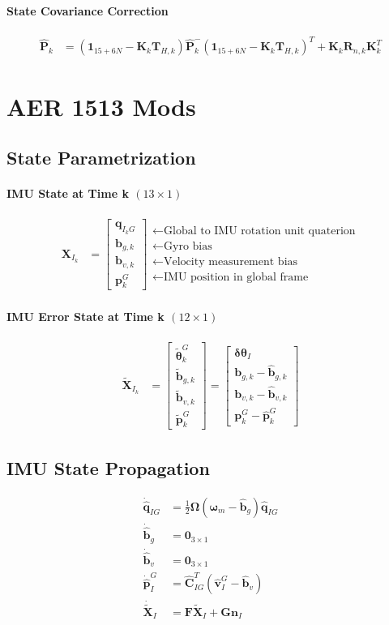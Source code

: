 \documentclass[10pt,letterpaper,fleqn,oneside]{article}
\newcommand{\nl}{\\[0.5em]}
\def\Vec#1{\mathbf{#1}} %
\newcommand{\bbm}{\begin{bmatrix}}
\newcommand{\ebm}{\end{bmatrix}}
\begin{document}
\paragraph{State Covariance Correction}
\begin{align}
\hat{\Vec{P}}_k &= \left(\Vec{1}_{15+6N} - \Vec{K}_k\Vec{T}_{H,k} \right)\hat{\Vec{P}}^-_k\left(\Vec{1}_{15+6N} - \Vec{K}_k\Vec{T}_{H,k} \right)^T + \Vec{K}_k\Vec{R}_{n,k}\Vec{K}_k^T
\end{align}

\section{AER 1513 Mods}

\subsection{State Parametrization}
\paragraph{IMU State at Time k $(13\times1)$}
\begin{align}
\Vec{X}_{I_k} &= \bbm \Vec{q}_{I_k G} \nl
								\Vec{b}_{g,k} \nl
								\Vec{b}_{v,k} \nl
								\Vec{p}^G_k 
						 \ebm 
						 \begin{array}{l}
						 \leftarrow \text{Global to IMU rotation unit quaterion} \nl
						 \leftarrow \text{Gyro bias} \nl
						 \leftarrow \text{Velocity measurement bias} \nl
						 \leftarrow \text{IMU position in global frame} 
						 \end{array}						 
\end{align}

\paragraph{IMU Error State at Time k $(12\times1)$}
\begin{align}
\widetilde{\Vec{X}}_{I_k} &= 	\bbm \widetilde{\boldsymbol{\theta}}^G_k \nl
										\widetilde{\Vec{b}}_{g,k} \nl
										\widetilde{\Vec{b}}_{v,k} \nl
										\widetilde{\Vec{p}}^G_k
								\ebm
								=
								\bbm
										\boldsymbol{\delta\theta}_I \nl
										\Vec{b}_{g,k} - \hat{\Vec{b}}_{g,k} \nl
										\Vec{b}_{v,k} - \hat{\Vec{b}}_{v,k} \nl
										\Vec{p}^G_k - \hat{\Vec{p}}^G_k 
								\ebm
\end{align}

\subsection{IMU State Propagation}
\begin{align}
\dot{\hat{\Vec{q}}}_{I G} &= \frac{1}{2}\boldsymbol{\Omega}\left(\boldsymbol{\omega}_m - \hat{\Vec{b}}_g \right)\hat{\Vec{q}}_{I G} \nl
\dot{\hat{\Vec{b}}}_g  &= \Vec{0}_{3\times1} \nl
\dot{\hat{\Vec{b}}}_v &= \Vec{0}_{3\times1} \nl
\dot{\hat{\Vec{p}}}^G_I &= \hat{\Vec{C}}_{I G}^T\left(\hat{\Vec{v}}^G_I - \hat{\Vec{b}}_v \right)\nl
\dot{\widetilde{\Vec{X}}}_I &= \Vec{F}\widetilde{\Vec{X}}_I + \Vec{G}\Vec{n}_I
\end{align}
\end{document}
